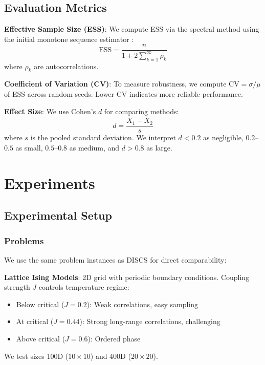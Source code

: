 \documentclass{article}
\newcommand{\ESS}{\text{ESS}}
\newcommand{\CV}{\text{CV}}
\begin{document}
\subsection{Evaluation Metrics}

\textbf{Effective Sample Size (ESS)}: We compute ESS via the spectral method using the initial monotone sequence estimator \citep{geyer1992practical}:
\begin{equation}
    \ESS = \frac{n}{1 + 2\sum_{k=1}^{\infty}\rho_k}
\end{equation}
where $\rho_k$ are autocorrelations.

\textbf{Coefficient of Variation (CV)}: To measure robustness, we compute $\CV = \sigma / \mu$ of ESS across random seeds. Lower CV indicates more reliable performance.

\textbf{Effect Size}: We use Cohen's $d$ for comparing methods:
\begin{equation}
    d = \frac{\bar{X}_1 - \bar{X}_2}{s}
\end{equation}
where $s$ is the pooled standard deviation. We interpret $d < 0.2$ as negligible, $0.2$--$0.5$ as small, $0.5$--$0.8$ as medium, and $d > 0.8$ as large.

\section{Experiments}
\label{sec:experiments}

\subsection{Experimental Setup}

\subsubsection{Problems}

We use the same problem instances as DISCS \citep{goshvadi2023discs} for direct comparability:

\textbf{Lattice Ising Models}: 2D grid with periodic boundary conditions. Coupling strength $J$ controls temperature regime:
\begin{itemize}
    \item Below critical ($J = 0.2$): Weak correlations, easy sampling
    \item At critical ($J = 0.44$): Strong long-range correlations, challenging
    \item Above critical ($J = 0.6$): Ordered phase
\end{itemize}
We test sizes 100D ($10 \times 10$) and 400D ($20 \times 20$).
\end{document}
